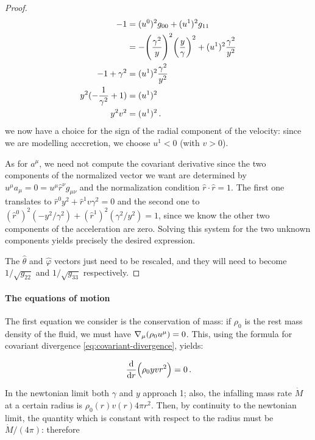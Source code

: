 \documentclass[main.tex]{subfiles}
\begin{document}
\begin{proof}
    \begin{subequations}
    \begin{align}
      -1 &= (u^0)^2 g_{00} + (u^1)^2 g_{11} \\
      &= -\qty(\frac{\gamma^2}{y})^2 \qty(\frac{y}{\gamma} )^2 + (u^1)^2 \frac{\gamma^2}{y^2} \\
      -1 + \gamma^2 &= (u^1)^2 \frac{\gamma^2}{y^2} \\
      y^2 (-\frac{1}{\gamma^2}  + 1) &= (u^1)^2 \\
      y^2 v^2 &= (u^1)^2 \,.
    \end{align}
    \end{subequations}
    we now have a choice for the sign of the radial component of the velocity: since we are modelling acccretion, we choose \(u^1 < 0\) (with \(v>0\)).

    As for \(a^\mu\), we need not compute the covariant derivative since the two components of the normalized vector we want are determined by \(u^\mu a_\mu = 0= u^\mu \hat{r}^\nu g_{\mu\nu}\) and the normalization condition \(\hat{r} \cdot \hat{r} = 1\). The first one translates to \(\hat{r}^0 y^2 + \hat{r} ^1 v \gamma^2 = 0\) and the second one to \((\hat{r}^0)^2 (- y^2 / \gamma^2) + (\hat{r}^1)^2 (\gamma^2 / y^2) = 1\), since we know the other two components of the acceleration are zero.
    Solving this system for the two unknown components yields precisely the desired expression.

    The \(\hat{\theta}\) and \(\hat{\varphi}\) vectors just need to be rescaled, and they will need to become \(1 / \sqrt{g_{22}}\) and \(1/\sqrt{g_{33}}\) respectively.
\end{proof}

\paragraph{The equations of motion}

The first equation we consider is the conservation of mass: if $\rho_0$ is the rest mass density of the fluid, we must have $\nabla_\mu \qty(\rho_0 u^\mu) =0$. This, using the formula for covariant divergence \eqref{eq:covariant-divergence}, yields:

\begin{equation} \label{eq:integral-continuity}
    \dv{}{r} \qty(\rho_0 yvr^2) = 0 \,.
\end{equation}

In the newtonian limit both $\gamma$ and $y$ approach 1; also, the infalling mass rate $\Dot{M}$ at a certain radius is $\rho_0 (r) v(r) 4\pi r^2$. Then, by continuity to the newtonian limit, the quantity which is constant with respect to the radius must be $\Dot{M} / (4\pi)$: therefore
\end{document}
